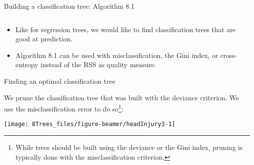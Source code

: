 \documentclass[10pt,ignorenonframetext,]{beamer}
\newenvironment{Shaded}{\begin{snugshade}}{\end{snugshade}}
\newcommand{\DataTypeTok}[1]{\textcolor[rgb]{0.13,0.29,0.53}{#1}}
\newcommand{\DecValTok}[1]{\textcolor[rgb]{0.00,0.00,0.81}{#1}}
\newcommand{\KeywordTok}[1]{\textcolor[rgb]{0.13,0.29,0.53}{\textbf{#1}}}
\newcommand{\NormalTok}[1]{#1}
\newcommand{\OperatorTok}[1]{\textcolor[rgb]{0.81,0.36,0.00}{\textbf{#1}}}
\newcommand{\StringTok}[1]{\textcolor[rgb]{0.31,0.60,0.02}{#1}}
\providecommand{\tightlist}{%
  \setlength{\itemsep}{0pt}\setlength{\parskip}{0pt}}
\begin{document}
\begin{frame}

\begin{block}{Building a classification tree: Algorithm 8.1}

\(~\)

\begin{itemize}
\tightlist
\item
  Like for regression trees, we would like to find classification trees
  that are good at prediction.
\end{itemize}

\vspace{2mm}

\begin{itemize}
\tightlist
\item
  Algorithm 8.1 can be used with misclassification, the Gini index, or
  cross-entropy instead of the RSS as quality measure.
\end{itemize}

\end{block}

\end{frame}

\begin{frame}[fragile]

\begin{block}{Finding an optimal classification tree}

\vspace{2mm}

We prune the classification tree that was built with the deviance
criterion. We use the misclassification error to do
so\footnote{While trees should be built using the deviance or the Gini index, pruning is typically done with the misclassification criterion.}:

\vspace{3mm}

\scriptsize

\begin{Shaded}
\end{Shaded}

\begin{center}\texttt{[image: 8Trees\_files/figure-beamer/headInjury3-1]} \end{center}

\end{block}

\end{frame}
\end{document}
